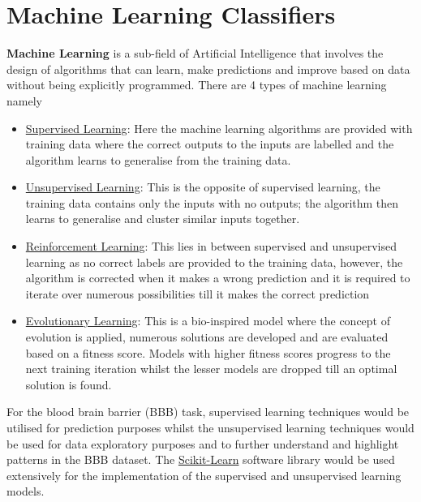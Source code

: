 \documentclass[a4paper,12pt]{report}
\begin{document}
\chapter{Machine Learning Classifiers}
	\textbf{Machine Learning} is a sub-field of Artificial Intelligence that involves the design of algorithms that can learn, make predictions and improve based on data without being explicitly programmed. There are 4 types of machine learning namely \cite{StephenM2014}
		\begin{itemize}
			\item \underline{Supervised Learning}: Here the machine learning algorithms are provided with training data where the correct outputs to the inputs are labelled and the algorithm learns to generalise from the training data.
			\item \underline{Unsupervised Learning}: This is the opposite of supervised learning, the training data contains only the inputs with no outputs; the algorithm then learns to generalise and cluster similar inputs together.
			\item \underline{Reinforcement Learning}: This lies in between supervised and unsupervised learning as no correct labels are provided to the training data, however, the algorithm is corrected when it makes a wrong prediction and it is required to iterate over numerous possibilities till it makes the correct prediction
			\item \underline{Evolutionary Learning}: This is a bio-inspired model where the concept of evolution is applied, numerous solutions are developed and are evaluated based on a fitness score. Models with higher fitness scores progress to the next training iteration whilst the lesser models are dropped till an optimal solution is found.
		\end{itemize}
	For the blood brain barrier (BBB) task, supervised learning techniques would be utilised for prediction purposes whilst the unsupervised learning techniques would be used for data exploratory purposes and to further understand and highlight patterns in the BBB dataset. The \href{http://scikit-learn.org/stable/}{Scikit-Learn} software library would be used extensively for the implementation of the supervised and unsupervised learning models.
	
\end{document}
